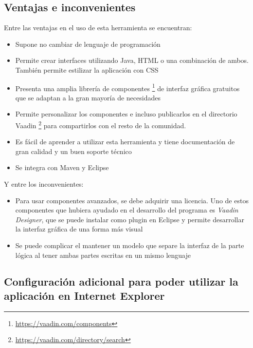 \subsection{Ventajas e inconvenientes}
Entre las ventajas en el uso de esta herramienta se encuentran:
\begin{itemize}
	\item Supone no cambiar de lenguaje de programación
	\item Permite crear interfaces utilizando Java, HTML o una combinación de ambos. También permite estilizar la aplicación con CSS
	\item Presenta una amplia librería de componentes \footnote{\url{https://vaadin.com/components}} de interfaz gráfica gratuitos que se adaptan a la gran mayoría de necesidades
	\item Permite personalizar los componentes e incluso publicarlos en el directorio Vaadin \footnote{\url{https://vaadin.com/directory/search}} para compartirlos con el resto de la comunidad.
	\item Es fácil de aprender a utilizar esta herramienta y tiene documentación de gran calidad y un buen soporte técnico
	\item Se integra con Maven y Eclipse
\end{itemize}

Y entre los inconvenientes:
\begin{itemize}
	\item Para usar componentes avanzados, se debe adquirir una licencia. Uno de estos componentes que hubiera ayudado en el desarrollo del programa es \textit{Vaadin Designer}, que se puede instalar como plugin en Eclipse y permite desarrollar la interfaz gráfica de una forma más visual
	\item Se puede complicar el mantener un modelo que separe la interfaz de la parte lógica al tener ambas partes escritas en un mismo lenguaje
\end{itemize}

\subsection{Configuración adicional para poder utilizar la aplicación en Internet Explorer}

